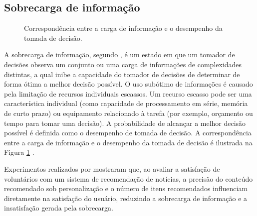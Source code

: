 \subsection{Sobrecarga de informação}
\vspace{0.2cm}
\begin{figure}[h]
    \caption{Correspondência entre a carga de informação e o desempenho da tomada
    de decisão.}
    \label{fig:u_invertida}
\end{figure}
\vspace{0.2cm}
A sobrecarga de informação, segundo \citet{roetzel2019information}, é um estado em que um tomador de decisões observa um
conjunto ou uma carga de informações de complexidades distintas, a qual inibe a
capacidade do tomador de decisões de determinar de forma ótima a melhor decisão
possível. O uso subótimo de informações é causado
pela limitação de recursos individuais escassos. Um recurso escasso pode ser uma
característica individual (como capacidade de processamento em série, memória de
curto prazo) ou equipamento relacionado à tarefa (por exemplo, orçamento ou
tempo para tomar uma decisão). A probabilidade de alcançar a melhor decisão
possível é definida como o desempenho de tomada de decisão. A correspondência
entre a carga de informação e o desempenho da tomada de decisão é ilustrada na
Figura \ref{fig:u_invertida} \cite{roetzel2019information}.

Experimentos realizados por \citet{liang2006personalized} mostraram que, ao
avaliar a satisfação de voluntários com um sistema de recomendação de notícias,
a precisão do conteúdo recomendado sob personalização e o número de itens
recomendados influenciam diretamente na satisfação do usuário, reduzindo a
sobrecarga de informação e a insatisfação gerada pela sobrecarga.

